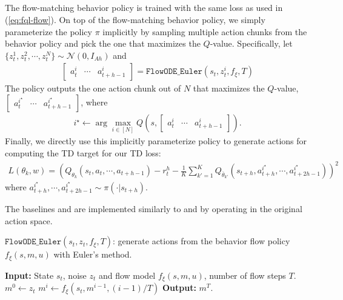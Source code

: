 \subsection{}
The flow-matching behavior policy is trained with the same loss as used in  (\cref{eq:fql-flow}). On top of the flow-matching behavior policy, we simply parameterize the policy $\pi$ implicitly by sampling multiple action chunks from the behavior policy and pick the one that maximizes the $Q$-value. Specifically, let $\{z_t^1, z^2_t, \cdots, z^N_t\} \sim \mathcal{N}(0, I_{Ah})$ and
\begin{align*}
    \begin{bmatrix}a_t^i & \cdots & a_{t+h-1}^{i}  \end{bmatrix} = \mathtt{FlowODE\_Euler}(s_t, z^i_t, f_\xi, T)
\end{align*}
The policy outputs the one action chunk out of $N$ that maximizes the $Q$-value, $\begin{bmatrix}a_t^{i^\star} & \cdots & a_{t+h-1}^{i^\star}  \end{bmatrix}$, where
\begin{align*}
     i^\star \leftarrow \arg\max_{i \in [N]} Q(s, \begin{bmatrix}a_t^i & \cdots & a_{t+h-1}^{i}  \end{bmatrix}).
\end{align*}
Finally, we directly use this implicitly parameterize policy to generate actions for computing the TD target for our TD loss:
\begin{align}
    L(\theta_k, w) = \left(Q_{\theta_k}(s_t, a_t, \cdots, a_{t+h-1}) - r^h_t - \frac{1}{K}\sum_{k'=1}^{K} Q_{\bar \theta_{k'}}(s_{t+h}, a^{i^\star}_{t+h}, \cdots, a^{i^\star}_{t+2h-1})\right)^2
    \label{eq:bfn-critic}
\end{align}
where $a^{i^\star}_{t+h}, \cdots, a^{i^\star}_{t+2h-1} \sim \pi(\cdot | s_{t+h})$.

The baselines  and  are implemented similarly to  and  by operating in the original action space. 


\begin{algorithm}[t]
  \caption{$\mathtt{FlowODE\_Euler}(s_t, z_t, f_\xi, T)$: generate actions from the behavior flow policy $f_\xi(s, m, u)$ with Euler's method.}\label{algo:flow-step}
  \begin{algorithmic}
\State \textbf{Input:} State $s_t$, noise $z_t$ and flow model $f_\xi(s, m, u)$, number of flow steps $T$.
\State $m^0 \leftarrow z_t$
    \State $m^i \leftarrow f_\xi(s_t, m^{i-1}, (i-1)/T)$
\EndFor
\State \textbf{Output:} $m^T$.
\end{algorithmic}
\end{algorithm}



